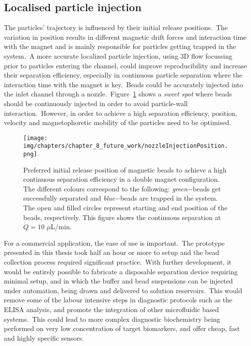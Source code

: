 \subsection{Localised particle injection}
The particles' trajectory is influenced by their initial release positions.\ The variation in position results in different magnetic drift forces and interaction time with the magnet and is mainly responsible for particles getting trapped in the system.\ A more accurate localized particle injection, using 3D flow focussing prior to particles entering the channel, could improve reproducibility and increase their separation efficiency, especially in continuous particle separation where the interaction time with the magnet is key.\ Beads could be accurately injected into the inlet channel through a nozzle.\ Figure~\ref{fig:nozzleInjection} shows a \textit{sweet spot} where beads should be continuously injected in order to avoid particle-wall interaction.\ However, in order to achieve a high separation efficiency, position, velocity and magnetophoretic mobility of the particles need to be optimised.\
\begin{figure}[htb]
\centering
\texttt{[image: img/chapters/chapter\_8\_future\_work/nozzleInjectionPosition.png]}
\caption[Bead injection through a nozzle]{Preferred initial release position of magnetic beads to achieve a high continuous separation efficiency in a double magnet configuration. The different colours correspond to the following: \textit{green}$-$beads get successfully separated and \textit{blue}$-$beads are trapped in the system. The open and filled circles represent starting and end position of the beads, respectively. This figure shows the continuous separation at $\dot{Q}=10$ $\mu$L/min.}
\label{fig:nozzleInjection}
\end{figure}
For a commercial application, the ease of use is important.\ The prototype presented in this thesis took half an hour or more to setup and the bead collection process required significant practice.\ With further development, it would be entirely possible to fabricate a disposable separation device requiring minimal setup, and in which the buffer and bead suspensions can be injected under automation, being drawn and delivered to solution reservoirs.\ This would remove some of the labour intensive steps in diagnostic protocols such as the ELISA analysis, and promote the integration of other microfluidic based systems.\ This could lead to more complex diagnostic biochemistry being performed on very low concentration of target biomarkers, and offer cheap, fast and highly specific sensors.\

